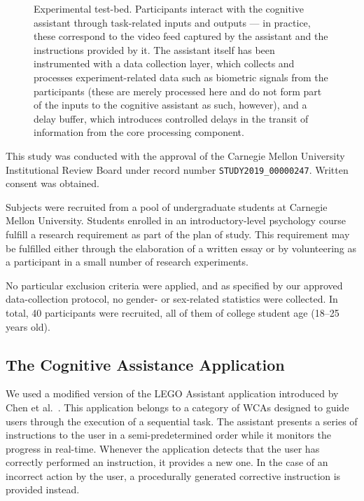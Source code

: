\documentclass[10pt,letterpaper]{article}
\begin{document}
\begin{figure}[h]
  \centering
  \caption{Experimental test-bed.
  Participants interact with the cognitive assistant through task-related inputs and outputs --- in practice, these correspond to the video feed captured by the assistant and the instructions provided by it.
  The assistant itself has been instrumented with a data collection layer, which collects and processes experiment-related data such as biometric signals from the participants (these are merely processed here and do not form part of the inputs to the cognitive assistant as such, however), and a delay buffer, which introduces controlled delays in the transit of information from the core processing component.}%
  \label{fig:experimentaltestbed}
\end{figure}

This study was conducted with the approval of the Carnegie Mellon University Institutional Review Board under record number \texttt{STUDY2019\_00000247}. 
Written consent was obtained.

Subjects were recruited from a pool of undergraduate students at Carnegie Mellon University.
Students enrolled in an introductory-level psychology course fulfill a research requirement as part of the plan of study.
This requirement may be fulfilled either through the elaboration of a written essay or by volunteering as a participant in a small number of research experiments.

No particular exclusion criteria were applied, and as specified by our approved data-collection protocol, no gender- or sex-related statistics were collected.
In total, 40 participants were recruited, all of them of college student age (\numrange{18}{25} years old).

\subsection{The Cognitive Assistance Application}

We used a modified version of the LEGO Assistant application introduced by Chen et al.~\cite{Chen:EarlyImplementation}.
This application belongs to a category of WCAs designed to guide users through the execution of a sequential task.
The assistant presents a series of instructions to the user in a semi-predetermined order while it monitors the progress in real-time.
Whenever the application detects that the user has correctly performed an instruction, it provides a new one.
In the case of an incorrect action by the user, a procedurally generated corrective instruction is provided instead.
\end{document}
